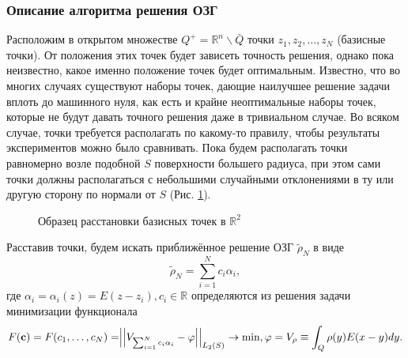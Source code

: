 \documentclass[a4paper, 12pt]{article}
\newcommand{\V}[1]{\int_Q #1(y) E(x-y) dy}
\newcommand{\R}[1]{\mathbb{R}^#1}
\begin{document}
\subsubsection{Описание алгоритма решения ОЗГ}
Расположим в открытом множестве $Q^+= \R{n}\backslash \bar Q$ точки $z_1,z_2,\dots,z_N$ (базисные точки). От положения этих точек будет зависеть точность решения, однако пока неизвестно, какое именно положение точек будет оптимальным.
Известно, что во многих случаях существуют наборы точек, дающие наилучшее решение задачи вплоть до машинного нуля, как есть и крайне неоптимальные наборы точек, которые не будут давать точного решения даже в тривиальном случае.
Во всяком случае, точки требуется располагать по какому-то правилу, чтобы результаты экспериментов можно было сравнивать.
Пока будем располагать точки равномерно возле подобной $S$ поверхности большего радиуса, при этом сами точки должны располагаться с небольшими случайными отклонениями в ту или другую сторону по нормали от $S$ (Рис. \ref{sample}).

\begin{figure}[!h]
    \noindent{}
    \caption{Образец расстановки базисных точек в $\R{2}$}
    \label{sample}
\end{figure}


Расставив точки, будем искать приближённое решение ОЗГ $\tilde \rho_N$ в виде
\begin{equation}
    \tilde \rho_N=\sum_{i=1}^N c_i \alpha_i,
\end{equation}
где $\alpha_i=\alpha_i(z)=E(z-z_i),c_i \in \mathbb{R}$ определяются из решения задачи минимизации функционала
\begin{equation}
    F({\bf c})=F(c_1,\dots,c_N)=\Bigr|\Bigr|V_{\sum_{i=1}^N c_i \alpha_i} -\varphi\Bigr|\Bigr|_{L_2(S)} \rightarrow \min, \varphi =V_{\rho} \equiv \V{\rho}. 
\end{equation}
\end{document}
